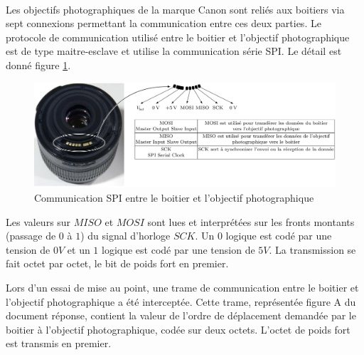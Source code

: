 
~\

Les objectifs photographiques de la marque Canon sont reliés aux boitiers via sept connexions permettant la communication entre ces deux parties. Le protocole de communication utilisé entre le boitier et l'objectif photographique est de type maitre-esclave et utilise la communication série SPI. Le détail est donné figure \ref{img07}.

\begin{figure}[!h]
\centering\includegraphics[width=0.9\linewidth]{img/figure_07}
 \caption{Communication SPI entre le boitier et l'objectif photographique}
  \label{img07}
\end{figure}

Les valeurs sur $MISO$ et $MOSI$ sont lues et interprétées sur les fronts montants (passage de $0$ à $1$) du signal d'horloge $SCK$. Un $0$ logique est codé par une tension de $0V$ et un $1$ logique est codé par une tension de $5V$. La transmission se fait octet par octet, le bit de poids fort en premier.

Lors d'un essai de mise au point, une trame de communication entre le boitier et l'objectif photographique a été interceptée. Cette trame, représentée figure A du document réponse, contient la valeur de l'ordre de déplacement demandée par le boitier à l'objectif photographique, codée sur deux octets. L'octet de poids fort est transmis en premier.



